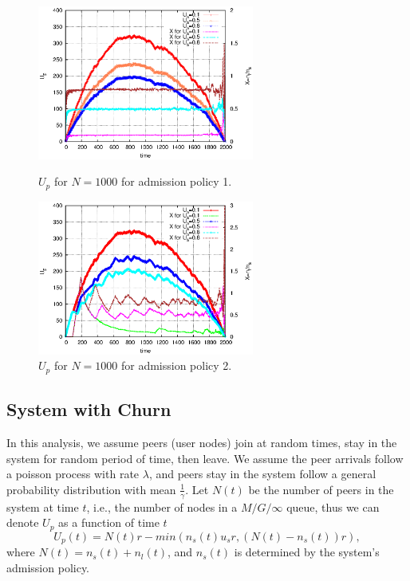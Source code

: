 \documentclass[paper]{ieice}
\begin{document}
\begin{figure}[thb]
\begin{minipage}[b]{0.4\linewidth}
\centering
\includegraphics[width=2.8in]{graphs/U_p_n_1000.eps}
\caption{$U_p$ for $N=1000$ for admission policy 1.}
\label{fig:U_p_1000_1}
\end{minipage}
\hspace{0.5cm}
\begin{minipage}[b]{0.5\linewidth}
\centering
\includegraphics[width=2.8in]{graphs/U_p_n_1000_admi.eps}
\caption{$U_p$ for $N=1000$ for admission policy 2.}
\label{fig:U_p_1000_2}
\end{minipage}
\end{figure}

\subsection{System with Churn}\label{sec:stablesystemwithchurn}

In this analysis, we assume peers (user nodes) join at random times, stay in the system for random period of time, then leave.
We assume the peer arrivals follow a poisson process with rate $\lambda$, and peers stay in the system follow a general probability distribution with mean $\frac{1}{\gamma}$.
Let $N(t)$ be the number of peers in the system at time $t$, i.e., the number of nodes in a $M/G/\infty$ queue, thus we can denote $U_p$ as a function of time $t$
\begin{equation}
        U_p(t) = N(t)r - min(n_s(t) u_s r, (N(t) - n_s(t))r),
\end{equation}
where $N(t) = n_s(t) + n_l(t)$, and $n_s(t)$ is determined by the system's admission policy.
\end{document}
